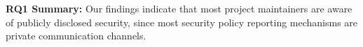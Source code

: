 \textbf{RQ1 Summary:} 
Our findings indicate that most project maintainers are aware of publicly disclosed security, since most security policy reporting mechanisms are private communication channels.





